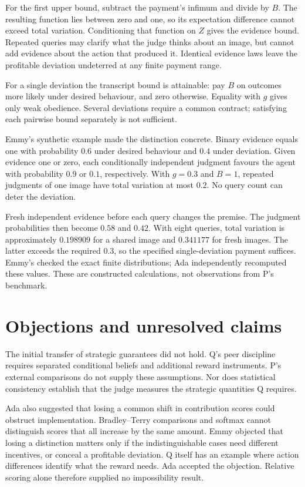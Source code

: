 \documentclass[11pt]{article}
\begin{document}
For the first upper bound, subtract the payment's infimum and divide by \(B\). The resulting function lies
between zero and one, so its expectation difference cannot exceed total variation. Conditioning that function
on \(Z\) gives the evidence bound. Repeated queries may clarify what the judge thinks about an image, but
cannot add evidence about the action that produced it. Identical evidence laws leave the profitable deviation
undeterred at any finite payment range.

For a single deviation the transcript bound is attainable: pay \(B\) on outcomes more likely under desired
behaviour, and zero otherwise. Equality with \(g\) gives only weak obedience. Several deviations require a
common contract; satisfying each pairwise bound separately is not sufficient.

Emmy's synthetic example made the distinction concrete. Binary evidence equals one with probability \(0.6\)
under desired behaviour and \(0.4\) under deviation. Given evidence one or zero, each conditionally
independent judgment favours the agent with probability \(0.9\) or \(0.1\), respectively. With \(g=0.3\) and
\(B=1\), repeated judgments of one image have total variation at most \(0.2\). No query count can deter the
deviation.

Fresh independent evidence before each query changes the premise. The judgment probabilities then become
\(0.58\) and \(0.42\). With eight queries, total variation is approximately \(0.198909\) for a shared image
and \(0.341177\) for fresh images. The latter exceeds the required \(0.3\), so the specified single-deviation
payment suffices. Emmy's  checked the exact finite distributions; Ada
independently recomputed these values. These are constructed calculations, not observations from P's
benchmark.

\section{Objections and unresolved claims}

The initial transfer of strategic guarantees did not hold. Q's peer discipline requires separated conditional
beliefs and additional reward instruments. P's external comparisons do not supply these assumptions. Nor does
statistical consistency establish that the judge measures the strategic quantities Q requires.

Ada also suggested that losing a common shift in contribution scores could obstruct implementation.
Bradley--Terry comparisons and softmax cannot distinguish scores that all increase by the same amount. Emmy
objected that losing a distinction matters only if the indistinguishable cases need different incentives, or
conceal a profitable deviation. Q itself has an example where action differences identify what the reward
needs. Ada accepted the objection. Relative scoring alone therefore supplied no impossibility result.
\end{document}
